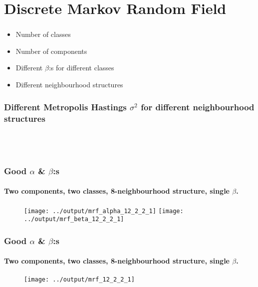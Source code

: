 \documentclass[12pt, english]{beamer}
\begin{document}
\section{Discrete Markov Random Field}
\begin{frame}
  \frametitle{}
  \framesubtitle{}

  \begin{block}{}
  \begin{itemize}
    \item Number of classes
    \item Number of components
    \item Different $\beta$:s for different classes
    \item Different neighbourhood structures
  \end{itemize}
  \end{block}

\end{frame}


\begin{frame}
  \frametitle{Different Metropolis Hastings $\sigma^2$ for different neighbourhood structures}
  \framesubtitle{}

\begin{table}
  \centering
  \begin{tabular}{c c c |}
    
  \end{tabular}
    \begin{tabular}{c c c}
    
  \end{tabular}
  \caption*{}
  \label{tab:sigma:n1}
\end{table}

\end{frame}

\begin{frame}
  \frametitle{Good $\alpha$ \& $\beta$:s}
  \framesubtitle{Two components, two classes, 8-neighbourhood structure, single $\beta$.}

\begin{figure}
\centering
\texttt{[image: ../output/mrf\_alpha\_12\_2\_2\_1]}
\texttt{[image: ../output/mrf\_beta\_12\_2\_2\_1]}
    \caption*{}
    \label{fig:alphabeta}  
\end{figure}
\end{frame}

\begin{frame}
  \frametitle{Good $\alpha$ \& $\beta$:s}
  \framesubtitle{Two components, two classes, 8-neighbourhood structure, single $\beta$.}

\begin{figure}
\centering
\texttt{[image: ../output/mrf\_12\_2\_2\_1]}
    \caption*{}
    \label{fig:mrf}  
\end{figure}
\end{frame}
\end{document}
